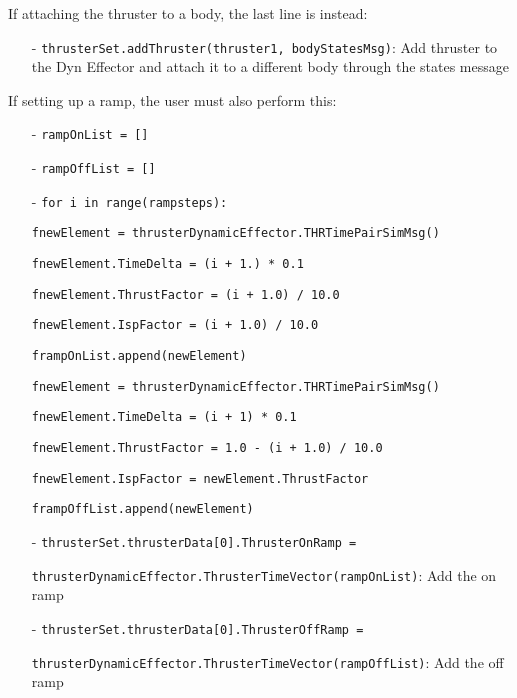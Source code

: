 If attaching the thruster to a body, the last line is instead:

\begin{itemize}
     \item[-]   \texttt{thrusterSet.addThruster(thruster1, bodyStatesMsg)}: Add thruster to the Dyn Effector and attach it to a different body through the states message
\end{itemize}

If setting up a ramp, the user must also perform this:

\begin{itemize}
 \item[-]      \texttt{rampOnList = []}
 \item[-]      \texttt{rampOffList = []}

 \item[-]      \texttt{for i in range(rampsteps):}
 
\hspace{2cm}\texttt{fnewElement = thrusterDynamicEffector.THRTimePairSimMsg()}

\hspace{2cm}\texttt{fnewElement.TimeDelta = (i + 1.) * 0.1}

\hspace{2cm}\texttt{fnewElement.ThrustFactor = (i + 1.0) / 10.0}

\hspace{2cm}\texttt{fnewElement.IspFactor = (i + 1.0) / 10.0}

\hspace{2cm}\texttt{frampOnList.append(newElement)}

\hspace{2cm}\texttt{fnewElement = thrusterDynamicEffector.THRTimePairSimMsg()}

\hspace{2cm}\texttt{fnewElement.TimeDelta = (i + 1) * 0.1}

\hspace{2cm}\texttt{fnewElement.ThrustFactor = 1.0 - (i + 1.0) / 10.0}

 \hspace{2cm}\texttt{fnewElement.IspFactor = newElement.ThrustFactor}
 
 \hspace{2cm}\texttt{frampOffList.append(newElement)}

 \item[-]      \texttt{thrusterSet.thrusterData[0].ThrusterOnRamp =}
 
  \texttt{thrusterDynamicEffector.ThrusterTimeVector(rampOnList)}: Add the on ramp
 \item[-]      \texttt{thrusterSet.thrusterData[0].ThrusterOffRamp =}
 
 \texttt{thrusterDynamicEffector.ThrusterTimeVector(rampOffList)}: Add the off ramp
            
            \end{itemize}
